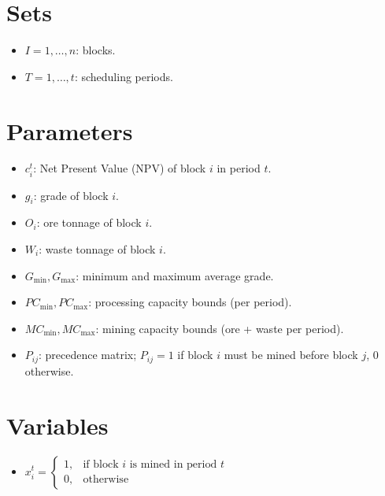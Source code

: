 \documentclass{article}
\begin{document}
\section{Sets}
\begin{itemize}[leftmargin=*,nosep]
    \item $I = 1, \ldots, n$: blocks.
    \item $T = 1, \ldots, t$: scheduling periods.
\end{itemize}

\section{Parameters}
\begin{itemize}[leftmargin=*,nosep]
    \item $c_i^t$: Net Present Value (NPV) of block $i$ in period $t$.
    \item $g_i$: grade of block $i$.
    \item $O_i$: ore tonnage of block $i$.
    \item $W_i$: waste tonnage of block $i$.
    \item $G_{\min}, G_{\max}$: minimum and maximum average grade.
    \item $PC_{\min}, PC_{\max}$: processing capacity bounds (per period).
    \item $MC_{\min}, MC_{\max}$: mining capacity bounds (ore + waste per period).
    \item $P_{ij}$: precedence matrix; $P_{ij} = 1$ if block $i$ must be mined before block $j$, $0$ otherwise.
\end{itemize}

\section{Variables}
\begin{itemize}[leftmargin=*,nosep]
    \item $x_i^t = \begin{cases} 
        1, & \text{if block } i \text{ is mined in period } t \\
        0, & \text{otherwise}
    \end{cases}$
\end{itemize}
\end{document}

